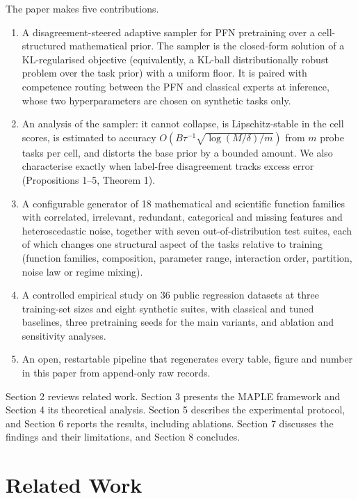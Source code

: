 \documentclass[mathematics,article,submit,pdftex,moreauthors]{Definitions/mdpi}
\begin{document}
The paper makes five contributions.

\begin{enumerate}
\item A disagreement-steered adaptive sampler for PFN pretraining over a cell-structured mathematical prior. The sampler is the closed-form solution of a KL-regularised objective (equivalently, a KL-ball distributionally robust problem over the task prior) with a uniform floor. It is paired with competence routing between the PFN and classical experts at inference, whose two hyperparameters are chosen on synthetic tasks only.
\item An analysis of the sampler: it cannot collapse, is Lipschitz-stable in the cell scores, is estimated to accuracy $O(B\tau^{-1}\sqrt{\log(M/\delta)/m})$ from $m$ probe tasks per cell, and distorts the base prior by a bounded amount. We also characterise exactly when label-free disagreement tracks excess error (Propositions 1--5, Theorem 1).
\item A configurable generator of 18 mathematical and scientific function families with correlated, irrelevant, redundant, categorical and missing features and heteroscedastic noise, together with seven out-of-distribution test suites, each of which changes one structural aspect of the tasks relative to training (function families, composition, parameter range, interaction order, partition, noise law or regime mixing).
\item A controlled empirical study on 36 public regression datasets at three training-set sizes and eight synthetic suites, with classical and tuned baselines, three pretraining seeds for the main variants, and ablation and sensitivity analyses.
\item An open, restartable pipeline that regenerates every table, figure and number in this paper from append-only raw records.
\end{enumerate}

Section 2 reviews related work. Section 3 presents the MAPLE framework and Section 4 its theoretical analysis. Section 5 describes the experimental protocol, and Section 6 reports the results, including ablations. Section 7 discusses the findings and their limitations, and Section 8 concludes.

\section{Related Work}
\end{document}
